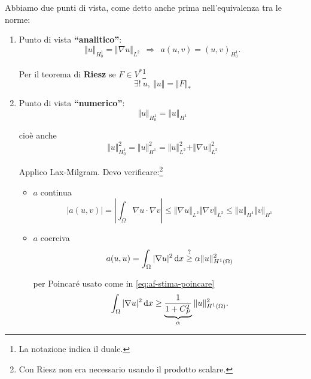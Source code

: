 Abbiamo due punti di vista, come detto anche prima nell'equivalenza tra le norme:
\begin{enumerate}
    \item Punto di vista \textbf{``analitico''}:
          \begin{equation*}
              \boxed{\Vert u\Vert _{H_{0}^{1}} =\Vert \nabla u\Vert _{L^{2}}} \ \ \Rightarrow \ \ a(u,v) =(u,v)_{H_{0}^{1}} .
          \end{equation*}

          Per il teorema di \textbf{Riesz }se $\displaystyle F\in V^{*}$\footnote{La notazione indica il duale.}
          \begin{equation*}
              \exists !\ u,\ \Vert u\Vert =\Vert F\Vert _{*}
          \end{equation*}
    \item Punto di vista \textbf{``numerico''}:
          \begin{equation*}
              \boxed{\Vert u\Vert _{H_{0}^{1}} =\Vert u\Vert _{H^{1}}}
          \end{equation*}

          cioè anche
          \begin{equation*}
              \Vert u\Vert _{H_{0}^{1}}^{2} =\Vert u\Vert _{H^{1}}^{2} =\Vert u\Vert _{L^{2}}^{2} +\Vert \nabla u\Vert _{L^{2}}^{2}
          \end{equation*}

          Applico Lax-Milgram. Devo verificare:\footnote{Con Riesz non era necessario usando il prodotto scalare.}
          \begin{itemize}
              \item $a$ continua
                    \begin{equation*}
                        | a(u,v)| =\left| \int _{\Omega } \nabla u\cdotp \nabla v\right| \leqslant \Vert \nabla u\Vert _{L^{2}}\Vert \nabla v\Vert _{L^{2}} \leqslant \Vert u\Vert _{H^{1}}\Vert v\Vert _{H^{1}}
                    \end{equation*}
              \item $a$ coerciva
                    \begin{equation*}
                        a(u,u) =\int _{\Omega }| \nabla u| ^{2} \,\mathrm d x\overset{?}{\geq } \alpha \Vert u\Vert _{H^{1}(\Omega)}^{2}
                    \end{equation*}

                    per Poincaré usato come in \eqref{eq:af-stima-poincare}
                    \begin{equation*}
                        \int _{\Omega }| \nabla u| ^{2} \,\mathrm d x\geq \underbrace{\frac{1}{1+C_{P}^{2}}}_{\alpha}\Vert u\Vert _{H^{1}(\Omega)}^{2} .
                    \end{equation*}
          \end{itemize}
\end{enumerate}

